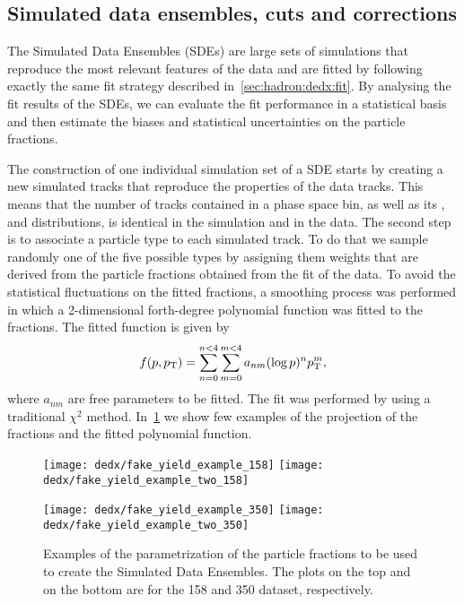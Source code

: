 \subsection{Simulated data ensembles, cuts and corrections}
\label{sec:hadron:dedx:sde}


The Simulated Data Ensembles (SDEs) are large sets of
simulations that reproduce the most relevant
features of the data and are fitted by following
exactly the same fit strategy described in~\cref{sec:hadron:dedx:fit}.
By analysing the fit results of the SDEs, we can evaluate the fit
performance in a statistical basis and then estimate the biases
and statistical uncertainties on the particle fractions. 

The construction of one individual simulation set of a SDE starts
by creating a new simulated tracks that reproduce the
properties of the data tracks. This means that the number of
tracks contained in a phase space bin, as well as its \pp, \pT and
\ncl distributions, is identical in the simulation and in the data.
The second step is to associate a particle type to each simulated track.
To do that we sample randomly one of the five possible types
by assigning them weights that are derived from the particle fractions
obtained from the \dedx fit of the data.
To avoid the statistical fluctuations on the fitted fractions,
a smoothing process was performed in which a 2-dimensional
forth-degree polynomial function was fitted to the fractions.
The fitted function is given by
\begin{equation}
  f(p,p_\text{T}) = \sum_{n=0}^{n<4} \sum_{m=0}^{m<4} a_{nm} (\log p)^n p_\text{T}^m,
  \label{eq:hadron:dedx:pol}
\end{equation}
where $a_{nm}$ are free parameters to be fitted.
The fit was performed by using a traditional $\chi^2$ method.
In~\cref{fig:hadron:dedx:fit:fakeyield} we show few examples
of the \pT projection of the fractions and the fitted
polynomial function. 


\begin{figure}[!ht]
  \centering
  \texttt{[image: dedx/fake\_yield\_example\_158]}
  \texttt{[image: dedx/fake\_yield\_example\_two\_158]}

  \vspace{0.5cm}
  
  \texttt{[image: dedx/fake\_yield\_example\_350]}
  \texttt{[image: dedx/fake\_yield\_example\_two\_350]}

  \caption{Examples of the parametrization of the particle fractions to be used to create the Simulated Data Ensembles. The plots on the top and on the bottom are for the 158 and 350 \GeVc dataset, respectively.}
  \label{fig:hadron:dedx:fit:fakeyield}
\end{figure}


